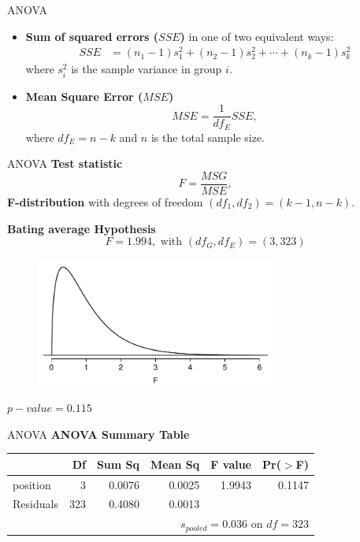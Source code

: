 \documentclass[12pt,a4paper]{beamer}
\begin{document}
\begin{frame}{ANOVA}
	\small\begin{itemize}
\item \textbf {Sum of squared errors ($SSE$)} in one of two equivalent ways:
	\begin{align*}
	SSE&= (n_1-1)s_1^2 + (n_2-1)s_2^2 + \cdots + (n_k-1)s_k^2
	\end{align*}
	where $s_i^2$ is the sample variance in group $i$. 
	\item \textbf{ Mean Square Error ($MSE$)} \\
	 \[MSE = \frac{1}{df_{E}}SSE,\]
	where $df_{E}=n-k$ and $n$ is the total sample size.
	\end{itemize}
\end{frame}
\begin{frame}{ANOVA}
	\textbf{Test statistic}
	\[F=\frac{MSG}{MSE},\]
	\textbf{F-distribution} with degrees of freedom $(df_1,df_2)=(k-1,n-k).$
\end{frame}
\begin{frame}
	\textbf{Bating average Hypothesis}
	\[F= 1.994,\text{ with }(df_G,df_E)=(3,323)\]
	\begin{figure}[ht]
	\centering
	\includegraphics[width=0.7\textwidth]{figures/fDist3And323/fDist3And323}
	
	\end{figure}
$p-value=0.115$
\end{frame}
\begin{frame}{ANOVA}
	\textbf{ANOVA Summary Table}
	\begin{table}[ht]
	\centering
	\begin{tabular}{lrrrrr}
	  \hline
	 & Df & Sum Sq & Mean Sq & F value & Pr($>$F) \\ 
	  \hline
	position & 3 & 0.0076 & 0.0025 & 1.9943 & 0.1147 \\ 
	  Residuals & 323 & 0.4080 & 0.0013 &  &  \\    \hline
	\multicolumn{6}{r}{$s_{pooled} = 0.036$ on $df=323$}
	\end{tabular}

	\label{anovaSummaryTableForOBPAgainstPosition}
	\end{table}
\end{frame}
\end{document}
